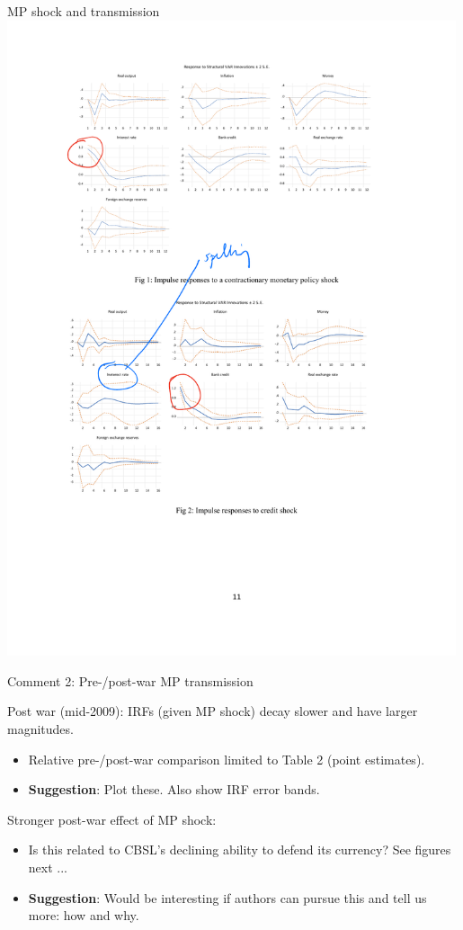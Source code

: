 \documentclass[10pt,english,slidetop,compress,
              blue,mathserif,color=option]{beamer}
\theoremstyle{plain}
\theoremstyle{definition}
\begin{document}
\begin{frame}{MP shock and transmission}
  \includegraphics[width=0.99\textwidth]{figures/MP-shock.pdf}
\end{frame}


\begin{frame}{Comment 2: Pre-/post-war MP transmission}

  Post war (mid-2009): IRFs (given MP shock) decay slower and have larger magnitudes.
    \begin{itemize}
      \item Relative pre-/post-war comparison limited to Table 2 (point estimates).
      \item \textbf{Suggestion}: Plot these. Also show IRF error bands.
    \end{itemize}  

    \bigskip

  Stronger post-war effect of MP shock:
    \begin{itemize}
      \item Is this related to CBSL's declining ability to defend its currency? See figures next ... 
      \item \textbf{Suggestion}: Would be interesting if authors can pursue this and tell us more: how and why.
    \end{itemize}

\end{frame}
\end{document}
